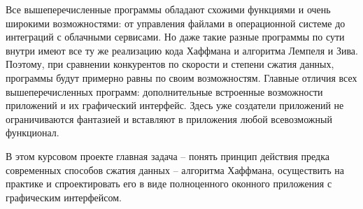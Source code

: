 Все вышеперечисленные программы обладают схожими функциями и очень широкими возможностями: от управления файлами в операционной системе до интеграций с облачными сервисами. 
Но даже такие разные программы по сути внутри имеют все ту же реализацию кода Хаффмана и алгоритма Лемпеля и Зива.
Поэтому, при сравнении конкурентов по скорости и степени сжатия данных, программы будут примерно равны по своим возможностям.
Главные отличия всех вышеперечисленных программ: дополнительные встроенные возможности приложений и их графический интерфейс. 
Здесь уже создатели приложений не ограничиваются фантазией и вставляют в приложения любой всевозможный функционал.



В этом курсовом проекте главная задача -- понять принцип действия предка современных способов сжатия данных -- алгоритма Хаффмана, осуществить на практике и спроектировать его в виде полноценного оконного приложения с графическим интерфейсом.